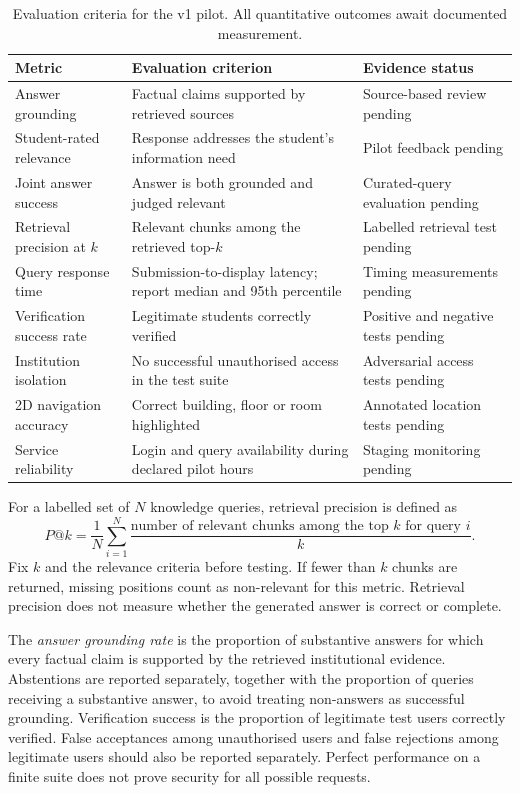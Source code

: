 \documentclass{tietreport}
\begin{document}
\begin{table}[htbp]
\centering
\small
\renewcommand{\arraystretch}{1.2}
\begin{tabularx}{\linewidth}{@{}Y Y Y@{}}
\toprule
\textbf{Metric} & \textbf{Evaluation criterion} & \textbf{Evidence status} \\
\midrule
Answer grounding & Factual claims supported by retrieved sources & Source-based review pending \\
Student-rated relevance & Response addresses the student's information need & Pilot feedback pending \\
Joint answer success & Answer is both grounded and judged relevant & Curated-query evaluation pending \\
Retrieval precision at $k$ & Relevant chunks among the retrieved top-$k$ & Labelled retrieval test pending \\
Query response time & Submission-to-display latency; report median and 95th percentile & Timing measurements pending \\
Verification success rate & Legitimate students correctly verified & Positive and negative tests pending \\
Institution isolation & No successful unauthorised access in the test suite & Adversarial access tests pending \\
2D navigation accuracy & Correct building, floor or room highlighted & Annotated location tests pending \\
Service reliability & Login and query availability during declared pilot hours & Staging monitoring pending \\
\bottomrule
\end{tabularx}
\caption{Evaluation criteria for the v1 pilot. All quantitative outcomes await documented measurement.}
\label{tab:performance}
\end{table}

For a labelled set of $N$ knowledge queries, retrieval precision is defined as
\[
  P@k = \frac{1}{N}\sum_{i=1}^{N}
    \frac{\text{number of relevant chunks among the top }k\text{ for query }i}{k}.
\]
Fix $k$ and the relevance criteria before testing. If fewer than $k$ chunks are
returned, missing positions count as non-relevant for this metric. Retrieval
precision does not measure whether the generated answer is correct or complete.

The \emph{answer grounding rate} is the proportion of substantive answers for
which every factual claim is supported by the retrieved institutional evidence.
Abstentions are reported separately, together with the proportion of queries
receiving a substantive answer, to avoid treating non-answers as successful
grounding. Verification success is the proportion of legitimate test users
correctly verified. False acceptances among unauthorised users and false
rejections among legitimate users should also be reported separately. Perfect performance on a finite suite does not prove
security for all possible requests.
\end{document}
